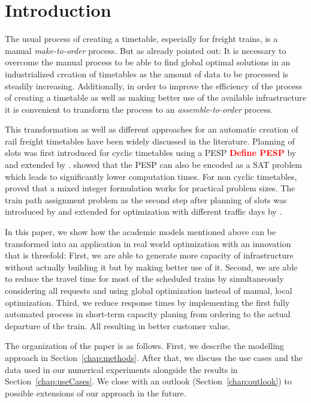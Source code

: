 \section{Introduction}
\label{chap:intro}
%
The usual process of creating a timetable, especially for freight trains, is a manual \emph{make-to-order} process. But as \cite{FP:2014} already pointed out: It is necessary to overcome the manual process to be able to find global optimal solutions in an industrialized creation of timetables as the amount of data to be processed is steadily increasing. Additionally, in order to improve the efficiency of the process of creating a timetable as well as making better use of the available infrastructure it is convenient to transform the process to an \emph{assemble-to-order} process.

This transformation as well as different approaches for an automatic creation of rail freight timetables have been widely discussed in the literature. Planning of slots was first introduced for cyclic timetables using a PESP \textbf{\textcolor{red}{Define PESP}} by \cite{N:1998} and extended by \cite{O:2009}. \cite{G:2012} showed that the PESP can also be encoded as a SAT problem which leads to significantly lower computation times. For non cyclic timetables, \cite{G:2013} proved that a mixed integer formulation works for practical problem sizes. The train path assignment problem as the second step after planning of slots was introduced by \cite{NO:2014} and extended for optimization with different traffic days by \cite{N:2015}.

In this paper, we show how the academic models mentioned above can be transformed into an application in real world optimization with an innovation that is threefold: First, we are able to generate more capacity of infrastructure without actually building it but by making better use of it. Second, we are able to reduce the travel time for most of the scheduled trains by simultaneously considering all requests and using global optimization instead of manual, local optimization. Third, we reduce response times by implementing the first fully automated process in short-term capacity planing from ordering to the actual departure of the train. All resulting in better customer value.

The organization of the paper is as follows. First, we describe the modelling approach in Section~\ref{chap:methods}. After that, we discuss the use cases and the data used in our numerical experiments alongside the results in Section~\ref{chap:useCases}. We close with an outlook (Section~\ref{chap:outlook}) to possible extensions of our approach in the future.